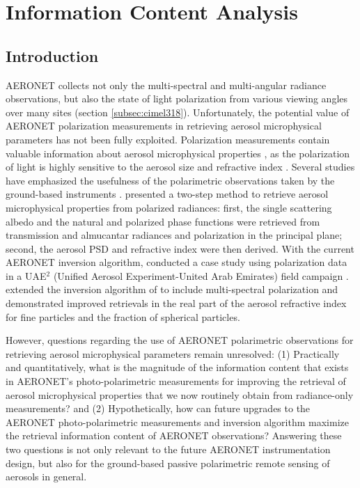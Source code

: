 \chapter{Information Content Analysis} \label{ch:info}

\section{Introduction}

AERONET collects not only the multi-spectral and multi-angular radiance
observations, but also the state of light polarization from various viewing
angles over many sites (section \ref{subsec:cimel318}). 
Unfortunately, the potential value of AERONET polarization
measurements in retrieving aerosol microphysical parameters has not been fully
exploited. Polarization measurements contain valuable information about aerosol
microphysical properties \citep{Mishchenko97,Cairns97}, as
the polarization of light is highly sensitive to the aerosol size and
refractive index \citep{Hansen74}. Several studies have emphasized the
usefulness of the polarimetric observations taken by the ground-based
instruments \citep{Cairns97, Boesche06, Emde10, Zeng08}.  
\citet{Vermeulen00} presented a two-step method to retrieve
aerosol microphysical properties from polarized radiances: first, the single
scattering albedo and the natural and polarized phase functions were retrieved
from transmission and almucantar radiances and polarization in the principal
plane; second, the aerosol PSD and refractive index were then derived. With the
current AERONET inversion algorithm, \citet{Dubovik06} conducted a case
study using polarization data in a UAE$^2$ (Unified Aerosol Experiment-United 
Arab Emirates) field campaign \citep{Reid08}. \citet{Li09} extended the
inversion algorithm of \citet{Dubovik06} to include multi-spectral
polarization and demonstrated improved retrievals in the real part of the aerosol
refractive index for fine particles and the fraction of spherical particles.

However, questions regarding the use of AERONET polarimetric observations for
retrieving aerosol microphysical parameters remain unresolved: (1)
Practically and quantitatively, what is the magnitude of the information
content that exists in AERONET's photo-polarimetric measurements for
improving the retrieval of aerosol microphysical properties that we now
routinely obtain from radiance-only measurements? and (2)
Hypothetically, how can future upgrades to the AERONET
photo-polarimetric measurements and inversion algorithm maximize the
retrieval information content of AERONET observations? Answering these
two questions is not only relevant to the future AERONET instrumentation
design, but also for the ground-based passive polarimetric remote
sensing of aerosols in general. 

